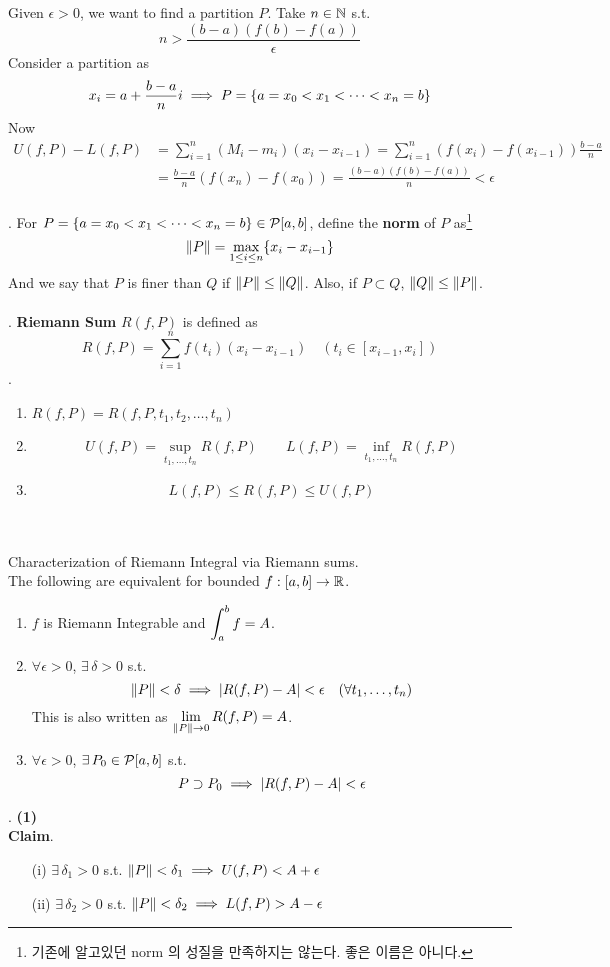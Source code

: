Given $\epsilon > 0$, we want to find a partition $P$. Take $n\in \mathbb{N}$ s.t. $$n > \frac{(b-a)(f(b)-f(a))}{\epsilon}$$
Consider a partition as $$x_i = a+ \frac{b-a}{n}i \implies P = \{a =x_0 < x_1 < \cdots < x_n = b \}$$
Now
$$\begin{aligned}
	U(f, P) - L(f, P) &= \sum_{i=1}^n (M_i-m_i)(x_i - x_{i-1})  = \sum_{i=1}^n (f(x_i) - f(x_{i-1})) \frac{b-a}{n}\\
	&=\frac{b-a}{n} (f(x_n)-f(x_0)) = \frac{(b-a)(f(b)-f(a))}{n} < \epsilon
\end{aligned}$$
\\
. For $P = \{a = x_0 < x_1 < \cdots < x_n = b \}\in \mathcal{P}[a, b]$, define the \textbf{norm} of $P$ as\footnote{기존에 알고있던 norm 의 성질을 만족하지는 않는다. 좋은 이름은 아니다.}
$$\left\lVert P\right\rVert = \max_{1\leq i \leq n} \{x_i - x_{i-1}\}$$
And we say that $P$ is finer than $Q$ if $\left\lVert P\right\rVert \leq \left\lVert Q\right\rVert$. Also, if $P\subset Q$, $\left\lVert Q\right\rVert\leq \left\lVert P\right\rVert$.\\
\\
. \textbf{Riemann Sum} $R(f, P)$ is defined as
$$R(f, P) = \sum_{i=1}^n f(t_i)(x_i-x_{i-1}) \quad (t_i\in [x_{i-1}, x_i])$$
\rmk.
\begin{enumerate}
	\item $R(f, P) = R(f, P, t_1, t_2, \dots, t_n)$
	\item $$U(f, P) = \sup_{t_1, \dots, t_n} R(f, P)
	\qquad L(f, P) = \inf_{t_1, \dots, t_n} R(f, P)$$
	\item $$L(f, P) \leq R(f, P) \leq U(f, P)$$
\end{enumerate}~
\\
\\
 Characterization of Riemann Integral via Riemann sums.\\
The following are equivalent for bounded $f:[a, b]\rightarrow \mathbb{R}$.
\begin{enumerate}
	\item $f$ is Riemann Integrable and $\displaystyle \int_a^b f = A$.
	\item $\forall \epsilon > 0$, $\exists\,\delta >0$ s.t. $$\left\lVert P\right\rVert < \delta \implies \left|R(f, P)-A\right| < \epsilon \quad (\forall t_1, \dots, t_n)$$
	This is also written as $\displaystyle \lim_{\left\lVert P\right\rVert\rightarrow0} R(f, P) = A$.
	\item $\forall\epsilon> 0$, $\exists\, P_0\in\mathcal{P}[a, b]$ s.t.
	$$P\supset P_0 \implies \left|R(f, P) - A\right|  < \epsilon$$
\end{enumerate}
\pf. \textbf{(1)}\\
\textbf{Claim}.
\begin{enumerate}
	\item[(i)] $\exists\,\delta_1 > 0$ s.t. $\left\lVert P\right\rVert < \delta_1 \implies U(f, P) < A + \epsilon$
	\item[(ii)] $\exists\,\delta_2 > 0$ s.t. $\left\lVert P\right\rVert < \delta_2 \implies L(f, P) > A - \epsilon$
\end{enumerate}
